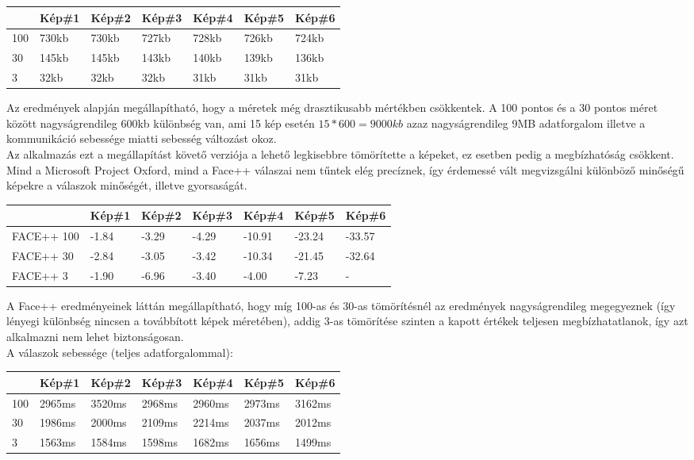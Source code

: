 \begin{center}
	\begin{tabular}{|p{1cm}|p{} |p{} | p{}|p{}|p{}|p{}|}
   	\hline
	 & Kép\#1 & Kép\#2& Kép\#3&Kép\#4 &Kép\#5 &Kép\#6\\ \hline
	100 & 730kb & 730kb & 727kb & 728kb & 726kb & 724kb \\ \hline
	30 & 145kb & 145kb & 143kb & 140kb & 139kb & 136kb \\ \hline
	3 & 32kb & 32kb & 32kb & 31kb & 31kb & 31kb\\ \hline
	\end{tabular}
\end{center}

Az eredmények alapján megállapítható, hogy a méretek még drasztikusabb mértékben csökkentek. A 100 pontos és a 30 pontos méret között nagyságrendileg 600kb különbség van, ami 15 kép esetén $15*600 = 9000kb$ azaz nagyságrendileg 9MB adatforgalom illetve a kommunikáció sebessége miatti sebesség változást okoz.
\\Az alkalmazás ezt a megállapítást követő verziója a lehető legkisebbre tömörítette a képeket, ez esetben pedig a megbízhatóság csökkent. Mind a Microsoft Project Oxford, mind a Face++ válaszai nem tűntek elég precíznek, így érdemessé vált megvizsgálni különböző minőségű képekre a válaszok minőségét, illetve gyorsaságát.

\begin{center}
	\begin{tabular}{|p{2cm}|p{} |p{} | p{}|p{}|p{}|p{}|}
   	\hline
	 & Kép\#1 & Kép\#2& Kép\#3&Kép\#4 &Kép\#5 &Kép\#6\\ \hline
	FACE++ 100 & -1.84 & -3.29 & -4.29 & -10.91 & -23.24 & -33.57 \\ \hline
	FACE++ 30 & -2.84 & -3.05 & -3.42 & -10.34 & -21.45 & -32.64 \\ \hline
	FACE++ 3 & -1.90 & -6.96 & -3.40 & -4.00 & -7.23 & -\\ \hline
	\end{tabular}
\end{center}

A Face++ eredményeinek láttán megállapítható, hogy míg 100-as és 30-as tömörítésnél az eredmények nagyságrendileg megegyeznek (így lényegi különbség nincsen a továbbított képek méretében), addig 3-as tömörítése szinten a kapott értékek teljesen megbízhatatlanok, így azt alkalmazni nem lehet biztonságosan. 
\\A válaszok sebessége (teljes adatforgalommal): 
\begin{center}
	\begin{tabular}{|p{1cm}|p{} |p{} | p{}|p{}|p{}|p{}|}
   	\hline
	 & Kép\#1 & Kép\#2& Kép\#3&Kép\#4 &Kép\#5 &Kép\#6\\ \hline
	100 & 2965ms & 3520ms & 2968ms & 2960ms & 2973ms & 3162ms \\ \hline
	30 & 1986ms & 2000ms & 2109ms & 2214ms & 2037ms & 2012ms \\ \hline
	3 & 1563ms & 1584ms & 1598ms & 1682ms & 1656ms & 1499ms\\ \hline
	\end{tabular}
\end{center}


